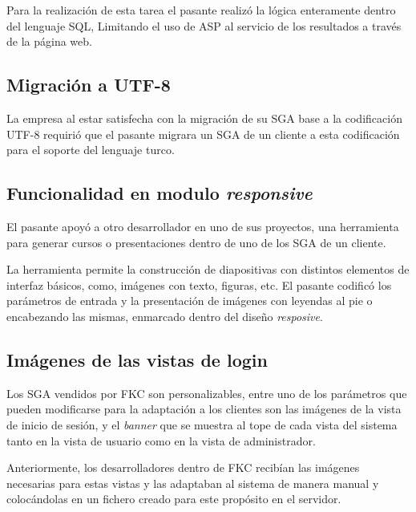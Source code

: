 	Para la realización de esta tarea el pasante realizó la lógica enteramente dentro del lenguaje SQL, Limitando el uso de ASP al servicio de los resultados a través de la página web.


	\subsection{Migración a UTF-8} %
	\label{sub:migracion_a_utf_8}
	
	La empresa al estar satisfecha con la migración de su SGA base a la codificación UTF-8 requirió que el pasante migrara un SGA de un cliente a esta codificación para el soporte del lenguaje turco.

	\subsection{Funcionalidad en modulo \emph{responsive}} %
	\label{sub:funcionalidad_en_modulo_responsive}
	
	El pasante apoyó a otro desarrollador en uno de sus proyectos, una herramienta para generar cursos o presentaciones dentro de uno de los SGA de un cliente.

	La herramienta permite la construcción de diapositivas con distintos elementos de interfaz básicos, como, imágenes con texto, figuras, etc. El pasante codificó los parámetros de entrada y la presentación de imágenes con leyendas al pie o encabezando las mismas, enmarcado dentro del diseño \emph{resposive}.


	\subsection{Imágenes de las vistas de login} %
	\label{sub:imagenes_de_las_vistas_de_login}
	
	Los SGA vendidos por FKC son personalizables, entre uno de los parámetros que pueden modificarse para la adaptación a los clientes son las imágenes de la vista de inicio de sesión, y el \emph{banner} que se muestra al tope de cada vista del sistema tanto en la vista de usuario como en la vista de administrador.

	Anteriormente, los desarrolladores dentro de FKC recibían las imágenes necesarias para estas vistas y las adaptaban al sistema de manera manual y colocándolas en un fichero creado para este propósito en el servidor.

